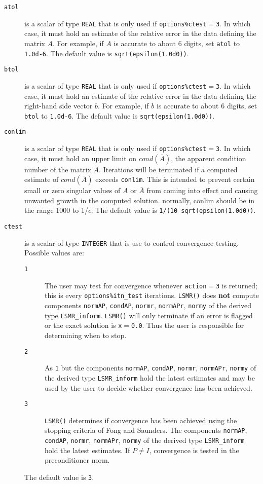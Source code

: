 \begin{description}

\item[\texttt{atol}] is a scalar of type {\tt REAL} that is only used if
   {\tt options\%ctest}$ =${\tt 3}.
   In which case, it must hold an estimate of the relative error in the data
   defining the matrix $A$.  For example, if $A$ is accurate to about 6 digits,
   set {\tt atol} to {\tt 1.0d-6}. The default value is {\tt sqrt(epsilon(1.0d0))}.

\item[\texttt{btol}] is a scalar of type {\tt REAL} that is only used if
   {\tt options\%ctest}$ =${\tt 3}.
   In which case, it must hold an estimate of the relative error in the data
   defining the right-hand side vector $ b$.  For example, if $b$ is
   accurate to about 6 digits, set {\tt btol} to {\tt 1.0d-6}. The default value is 
   {\tt sqrt(epsilon(1.0d0))}.


\item[\texttt{conlim}] is a scalar of type {\tt REAL} that is only used if
   {\tt options\%ctest}$ =${\tt 3}.
   In which case, it must hold an upper limit on $cond(\bar{A})$, the apparent
   condition number of the matrix $\bar{A}$. Iterations will be terminated 
   if a computed estimate of $cond(\bar{A})$ exceeds {\tt conlim}.
   This is intended to prevent certain small or
   zero singular values of $A$ or $\bar{A}$ from
   coming into effect and causing unwanted growth in the computed solution.
   normally, conlim should be in the range 1000 to 1/$\epsilon$.
   The default value is {\tt 1/(10 sqrt(epsilon(1.0d0))}.

\item[\texttt{ctest}] is a scalar of type {\tt INTEGER} that is use to control
   convergence testing. Possible values are:
   \begin{description}
   \item[\texttt{1}] The user may test for convergence whenever 
      {\tt action}$ = ${\tt 3} is returned; this is
      every {\tt options\%itn\_test} iterations.
      {\tt LSMR()} does {\bf not} compute components
      {\tt normAP}, {\tt condAP}, {\tt normr}, {\tt normAPr}, {\tt normy}
      of the derived type {\tt LSMR\_inform}.
      {\tt LSMR()} will only terminate if an  error is flagged
      or the exact solution is {\tt x}$ = ${\tt 0.0}.
      Thus the user is responsible for determining when to stop.
   \item[\texttt{2}] As {\texttt 1} but the components
      {\tt normAP}, {\tt condAP}, {\tt normr}, {\tt normAPr}, {\tt normy}
      of the derived type {\tt LSMR\_inform} hold the latest estimates and
      may be used by the user to decide whether convergence has been achieved.
   \item[\texttt{3}] {\tt LSMR()} determines if convergence has been achieved
      using the stopping criteria of Fong and Saunders. The components
      {\tt normAP}, {\tt condAP}, {\tt normr}, {\tt normAPr}, {\tt normy}
      of the derived type {\tt LSMR\_inform} hold the latest estimates.
      If $P \neq I$,  convergence is tested in the
      preconditioner norm.
   \end{description}
   The default value is {\tt 3}.


\end{description}
